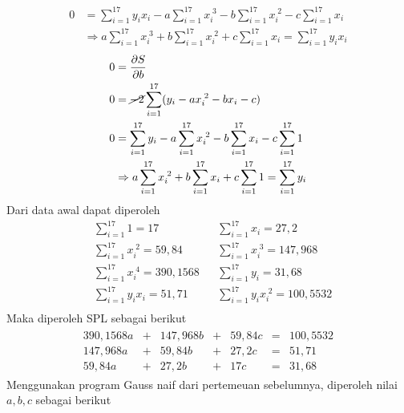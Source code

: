 \documentclass[12pt]{article}
\begin{document}
\begin{enumerate}
{\begin{align*}
            0   & = \sum_{i = 1}^{17}y_ix_i - a\sum_{i = 1}^{17}x_i^{\;3} - b\sum_{i = 1}^{17}x_i^{\;2} - c\sum_{i = 1}^{17}x_i \\
                & \Rightarrow a\sum_{i = 1}^{17}x_i^{\;3} + b\sum_{i = 1}^{17}x_i^{\;2} + c\sum_{i = 1}^{17}x_i = \sum_{i = 1}^{17}y_ix_i
        \end{align*}
        \begin{align*}
            0   & = \frac{\partial S}{\partial b}\\
            0   & = \cancel{-2}\sum_{i = 1}^{17}(y_i - ax_i^{\;2} - bx_i - c)\\
            0   & = \sum_{i = 1}^{17}y_i - a\sum_{i = 1}^{17}x_i^{\;2} - b\sum_{i = 1}^{17}x_i - c\sum_{i = 1}^{17}1 \\
                & \Rightarrow a\sum_{i = 1}^{17}x_i^{\;2} + b\sum_{i = 1}^{17}x_i + c\sum_{i = 1}^{17}1 = \sum_{i = 1}^{17}y_i
        \end{align*}
        Dari data awal dapat diperoleh
        \begin{align*}
            & \sum_{i = 1}^{17} 1            = 17 &
            & \sum_{i = 1}^{17} x_i          = 27,2 \\
            & \sum_{i = 1}^{17} x_i^{\;2}    = 59,84 &
            & \sum_{i = 1}^{17} x_i^{\;3}    = 147,968 \\
            & \sum_{i = 1}^{17} x_i^{\;4}    = 390,1568 &
            & \sum_{i = 1}^{17} y_i          = 31,68 \\
            & \sum_{i = 1}^{17} y_ix_i       = 51,71 &
            & \sum_{i = 1}^{17} y_ix_i^{\;2} = 100,5532 \\
        \end{align*}
        Maka diperoleh SPL sebagai berikut
        \begin{align*}
            \begin{matrix}
                390,1568 a &+& 147,968 b &+& 59,84 c    & = & 100,5532 \\
                147,968 a &+& 59,84 b &+& 27,2 c        & = & 51,71 \\
                59,84 a &+& 27,2 b &+& 17 c             & = & 31,68 
            \end{matrix}
        \end{align*}
        Menggunakan program Gauss naif dari pertemeuan sebelumnya, diperoleh nilai $ a, b, c $ sebagai berikut
        \begin{lstlisting}


\end{lstlisting}}
\end{enumerate}
\end{document}
